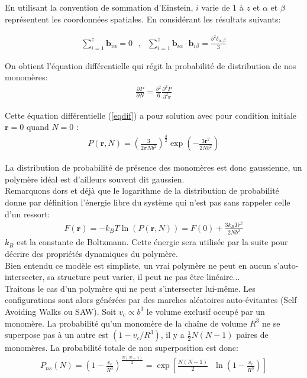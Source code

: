En utilisant la convention de sommation d'Einstein, $i$ varie de $1$ à $z$ et $\alpha$ et $\beta$ représentent les coordonnées spatiales. En considérant les résultats suivants:

\begin{eqnarray}
\sum_{i=1}^{z}\textbf{b}_{i\alpha}=0 \text{ },\text{ } \sum_{i=1}^{z}\textbf{b}_{i\alpha}\cdot\textbf{b}_{i\beta} = \frac{b^2\delta_{\alpha,\beta}}{3}
\end{eqnarray}

On obtient l'équation différentielle qui régit la probabilité de distribution de nos monomères:
\begin{eqnarray}
 \frac{\partial P}{\partial N} =   \frac{b^2}{6}\frac{\partial ^2 P}{\partial ^2 \textbf{r}}
 \label{eqdif}
\end{eqnarray}

Cette équation différentielle (\ref{eqdif}) a pour solution avec pour condition initiale $\textbf{r}=0$ quand $N=0$ :
\begin{eqnarray}
P(\textbf{r},N)=\left(\frac{3}{2\pi N b^2}\right)^\frac{3}{2}\exp\left(-\frac{3\textbf{r}^2}{2 N b^2}\right)
\end{eqnarray}

La distribution de probabilité de présence des monomères est donc gaussienne, un polymère idéal est d'ailleurs souvent dit gaussien.\\

Remarquons dors et déjà que le logarithme de la distribution de probabilité donne par définition l'énergie libre du système qui n'est pas sans rappeler celle d'un ressort:
\begin{eqnarray}
F(\textbf{r})= - k_B T \ln(P(\textbf{r},N))= F(0)+\frac{3k_BTr^2}{2Nb^2}
\label{elibre}
\end{eqnarray}
$k_B$ est la constante de Boltzmann. Cette énergie sera utilisée par la suite pour décrire des propriétés dynamiques du polymère.\\



Bien entendu ce modèle est simpliste, un vrai polymère ne peut en aucun s'auto-intersecter, sa structure peut varier, il peut ne pas être linéaire...\\

 Traitons le cas d'un polymère qui ne peut s'intersecter lui-même. Les configurations sont alors générées par des marches aléatoires auto-évitantes (Self Avoiding Walks ou SAW). Soit $v_c \propto b^3$ le volume exclusif occupé par un monomère. La probabilité qu'un monomère de la chaîne de volume $R^3$ ne se superpose pas à un autre est $(1-v_c/R^3)$, il y a $\frac{1}{2}N(N-1)$ paires de monomères. La probabilité totale de non superposition est donc:
 \begin{eqnarray}
P_{ns}(N)= \left(1-\frac{v_c}{R^3}\right)^{\frac{N(N-1)}{2}} = \exp\left[\frac{N(N-1)}{2}\text{ }\ln\left(1-\frac{v_c}{R^3}\right)\right]
\end{eqnarray}

